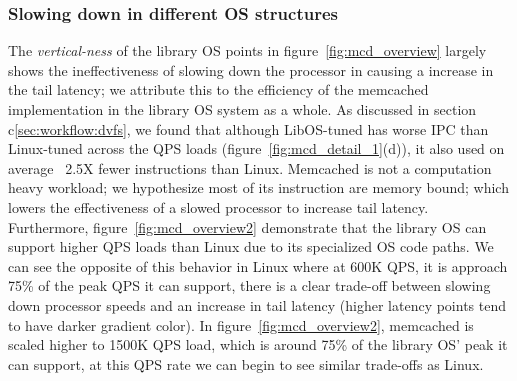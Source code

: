 \subsubsection{Slowing down in different OS structures } 
\label{sec:mcd:slowinos}
The \textit{vertical-ness} of the library OS points in figure~\ref{fig:mcd_overview} largely shows the ineffectiveness of slowing down the processor in causing a increase in the tail latency; we attribute this to the efficiency of the memcached implementation in the library OS system as a whole. As discussed in section c\ref{sec:workflow:dvfs}, we found that although LibOS-tuned has worse IPC than Linux-tuned across the QPS loads (figure~\ref{fig:mcd_detail_1}(d)), it also used on average ~2.5X fewer instructions than Linux. Memcached is not a computation heavy workload; we hypothesize most of its instruction are memory bound; which lowers the effectiveness of a slowed processor to increase tail latency. Furthermore, figure~\ref{fig:mcd_overview2} demonstrate that the library OS can support higher QPS loads than Linux due to its specialized OS code paths. We can see the opposite of this behavior in Linux where at 600K QPS, it is approach 75\% of the peak QPS it can support, there is a clear trade-off between slowing down processor speeds and an increase in tail latency (higher latency points tend to have darker gradient color). In figure~\ref{fig:mcd_overview2}, memcached is scaled higher to 1500K QPS load, which is around 75\% of the library OS' peak it can support, at this QPS rate we can begin to see similar trade-offs as Linux.

